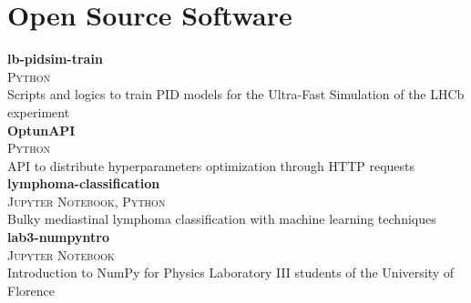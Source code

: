 \newcommand{\pkgname}[1]
  {\normalsize \color{hlcolor-0} \textbf{#1}}

\newcommand{\pkginfo}[1]
  {\small \color{hlcolor-1} \textsc{#1}}
  
\newcommand{\pkgdesc}[1]
  {\normalsize \color{maincolor} {#1}}


\section*{Open Source Software}
\begin{cvcontent}
  \pkgname{lb-pidsim-train} \hfill
  \\
  \pkginfo{Python}\\
  \pkgdesc{Scripts and logics to train PID models for the Ultra-Fast Simulation of the LHCb experiment}
  \\ [3mm]
  \pkgname{OptunAPI} \hfill
  \\
  \pkginfo{Python}\\
  \pkgdesc{API to distribute hyperparameters optimization through HTTP requests}
  \\ [3mm]
  \pkgname{lymphoma-classification} \hfill
  \\
  \pkginfo{Jupyter Notebook, Python}\\
  \pkgdesc{Bulky mediastinal lymphoma classification with machine learning techniques}
  \\ [3mm]
  \pkgname{lab3-numpyntro} \hfill
  \\
  \pkginfo{Jupyter Notebook}\\
  \pkgdesc{Introduction to NumPy for Physics Laboratory III students of the University of Florence}
\end{cvcontent}